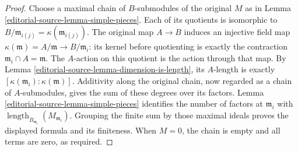 \begin{proof}
Choose a maximal chain of $B$-submodules of the original $M$
as in Lemma \ref{editorial-source-lemma-simple-pieces}. Each of its quotients is
isomorphic to $B/\mathfrak m_{i(j)}=\kappa(\mathfrak m_{i(j)})$.
The original map $A\to B$ induces an injective field map
$\kappa(\mathfrak m)=A/\mathfrak m\to B/\mathfrak m_i$:
its kernel before quotienting is exactly the contraction
$\mathfrak m_i\cap A=\mathfrak m$.
The $A$-action on this quotient is the action through that map.
By Lemma \ref{editorial-source-lemma-dimension-is-length}, its $A$-length is
exactly $[\kappa(\mathfrak m_i):\kappa(\mathfrak m)]$.
Additivity along the original chain, now regarded as a chain
of $A$-submodules, gives the sum of these degrees over its factors.
Lemma \ref{editorial-source-lemma-simple-pieces} identifies the number of factors
at $\mathfrak m_i$ with
$\operatorname{length}_{B_{\mathfrak m_i}}(M_{\mathfrak m_i})$.
Grouping the finite sum by those maximal ideals proves the
displayed formula and its finiteness. When $M=0$, the chain
is empty and all terms are zero, as required.


\end{proof}
